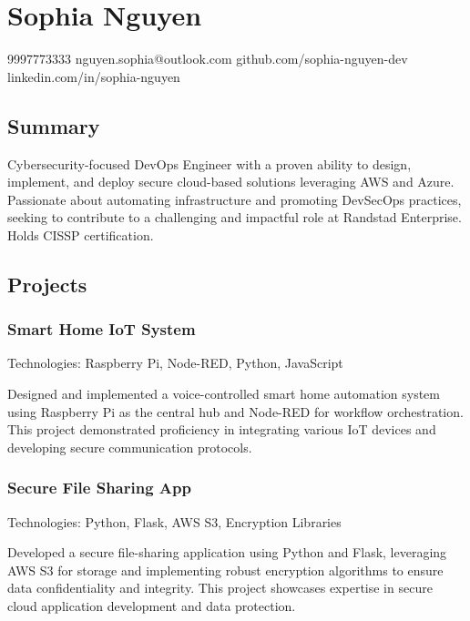 \documentclass[
]{article}
\author{}
\date{}
\begin{document}
\section{Sophia Nguyen}\label{sophia-nguyen}

9997773333 \textbar{} nguyen.sophia@outlook.com \textbar{}
github.com/sophia-nguyen-dev \textbar{} linkedin.com/in/sophia-nguyen

\subsection{\texorpdfstring{\textbf{Summary}}{Summary}}\label{summary}

Cybersecurity-focused DevOps Engineer with a proven ability to design,
implement, and deploy secure cloud-based solutions leveraging AWS and
Azure. Passionate about automating infrastructure and promoting
DevSecOps practices, seeking to contribute to a challenging and
impactful role at Randstad Enterprise. Holds CISSP certification.

\subsection{\texorpdfstring{\textbf{Projects}}{Projects}}\label{projects}

\subsubsection{\texorpdfstring{\textbf{Smart Home IoT
System}}{Smart Home IoT System}}\label{smart-home-iot-system}

Technologies: Raspberry Pi, Node-RED, Python, JavaScript

Designed and implemented a voice-controlled smart home automation system
using Raspberry Pi as the central hub and Node-RED for workflow
orchestration. This project demonstrated proficiency in integrating
various IoT devices and developing secure communication protocols.

\subsubsection{\texorpdfstring{\textbf{Secure File Sharing
App}}{Secure File Sharing App}}\label{secure-file-sharing-app}

Technologies: Python, Flask, AWS S3, Encryption Libraries

Developed a secure file-sharing application using Python and Flask,
leveraging AWS S3 for storage and implementing robust encryption
algorithms to ensure data confidentiality and integrity. This project
showcases expertise in secure cloud application development and data
protection.
\end{document}
